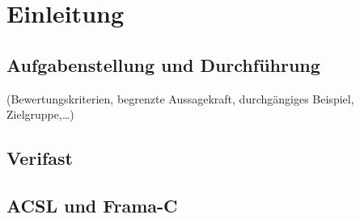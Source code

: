 \chapter{Einleitung}

\section{Aufgabenstellung und Durchführung}
(Bewertungskriterien, begrenzte Aussagekraft, durchgängiges Beispiel,
Zielgruppe,…)

\section{Verifast}
\label{sec:verifast}

\section{ACSL und Frama-C}
\label{acsl}